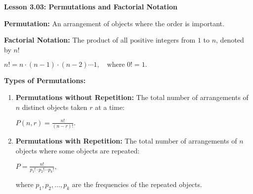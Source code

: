\begin{center}
\textbf{Lesson 3.03: Permutations and Factorial Notation}
\end{center}

\vspace*{-1.5ex}


\noindent \textbf{Permutation:} An arrangement of objects where the order is important.

\noindent \textbf{Factorial Notation:} The product of all positive integers from \(1\) to \(n\), denoted by \(n!\)

{\centering $ n! = n \cdot (n-1) \cdot (n-2) \cdots 1, \quad \text{where } 0! = 1.  $\par}

\noindent \textbf{Types of Permutations:}
    \begin{enumerate}
        \item \textbf{Permutations without Repetition:} The total number of arrangements of \(n\) distinct objects taken \(r\) at a time:

          {\centering $ 
              P(n, r) = \frac{n!}{(n-r)!}.
              $\par}
            
        \item \textbf{Permutations with Repetition:} The total number of arrangements of \(n\) objects where some objects are repeated:

          {\centering $ 
              P = \frac{n!}{p_1! \cdot p_2! \cdots p_k!},
              $\par}
            
              where \(p_1, p_2, \ldots, p_k\) are the frequencies of the repeated objects.
    \end{enumerate}

